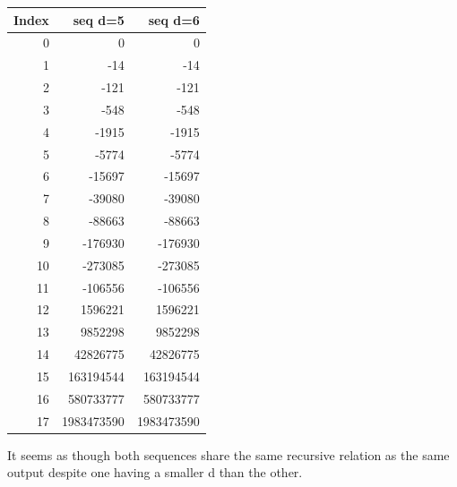 \documentclass{article}
\begin{document}
\begin{table}[ht]
	\centering
 	\small %
    \begin{tabular}{rrr}
		\toprule
		\textbf{Index} & \textbf{seq d=5} & \textbf{seq d=6} \\
		\midrule
        0 & 0 & 0 \\
		1 & -14 & -14 \\
		2 & -121 & -121 \\
		3 & -548 & -548 \\
		4 & -1915 & -1915 \\
		5 & -5774 & -5774 \\
		6 & -15697 & -15697 \\
		7 & -39080 & -39080 \\
		8 & -88663 & -88663 \\
		9 & -176930 & -176930 \\
		10 & -273085 & -273085 \\
		11 & -106556 & -106556 \\
		12 & 1596221 & 1596221 \\
		13 & 9852298 & 9852298 \\
		14 & 42826775 & 42826775 \\
		15 & 163194544 & 163194544 \\
		16 & 580733777 & 580733777 \\
		17 & 1983473590 & 1983473590 \\
		\bottomrule
	\end{tabular}
\end{table}

It seems as though both sequences share the same recursive relation as the same output despite one having a smaller d than the other.
\\
\end{document}
